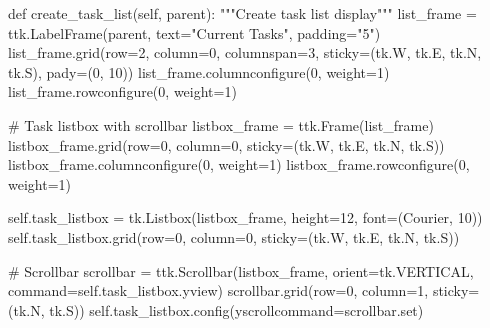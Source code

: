 \documentclass[
  letterpaper,
  DIV=11,
  numbers=noendperiod,
  oneside]{scrreprt}
\newenvironment{Shaded}{}{}
\newcommand{\BuiltInTok}[1]{\textcolor[rgb]{0.84,0.23,0.29}{#1}}
\newcommand{\CommentTok}[1]{\textcolor[rgb]{0.42,0.45,0.49}{#1}}
\newcommand{\DecValTok}[1]{\textcolor[rgb]{0.00,0.36,0.77}{#1}}
\newcommand{\KeywordTok}[1]{\textcolor[rgb]{0.84,0.23,0.29}{#1}}
\newcommand{\NormalTok}[1]{\textcolor[rgb]{0.14,0.16,0.18}{#1}}
\newcommand{\OperatorTok}[1]{\textcolor[rgb]{0.14,0.16,0.18}{#1}}
\newcommand{\StringTok}[1]{\textcolor[rgb]{0.01,0.18,0.38}{#1}}
\newcommand{\VariableTok}[1]{\textcolor[rgb]{0.89,0.38,0.04}{#1}}
\begin{document}
\begin{Shaded}
\begin{Highlighting}[]
    \KeywordTok{def}\NormalTok{ create\_task\_list(}\VariableTok{self}\NormalTok{, parent):}
        \CommentTok{"""Create task list display"""}
\NormalTok{        list\_frame }\OperatorTok{=}\NormalTok{ ttk.LabelFrame(parent, text}\OperatorTok{=}\StringTok{"Current Tasks"}\NormalTok{, padding}\OperatorTok{=}\StringTok{"5"}\NormalTok{)}
\NormalTok{        list\_frame.grid(row}\OperatorTok{=}\DecValTok{2}\NormalTok{, column}\OperatorTok{=}\DecValTok{0}\NormalTok{, columnspan}\OperatorTok{=}\DecValTok{3}\NormalTok{, sticky}\OperatorTok{=}\NormalTok{(tk.W, tk.E, tk.N, tk.S), pady}\OperatorTok{=}\NormalTok{(}\DecValTok{0}\NormalTok{, }\DecValTok{10}\NormalTok{))}
\NormalTok{        list\_frame.columnconfigure(}\DecValTok{0}\NormalTok{, weight}\OperatorTok{=}\DecValTok{1}\NormalTok{)}
\NormalTok{        list\_frame.rowconfigure(}\DecValTok{0}\NormalTok{, weight}\OperatorTok{=}\DecValTok{1}\NormalTok{)}
        
        \CommentTok{\# Task listbox with scrollbar}
\NormalTok{        listbox\_frame }\OperatorTok{=}\NormalTok{ ttk.Frame(list\_frame)}
\NormalTok{        listbox\_frame.grid(row}\OperatorTok{=}\DecValTok{0}\NormalTok{, column}\OperatorTok{=}\DecValTok{0}\NormalTok{, sticky}\OperatorTok{=}\NormalTok{(tk.W, tk.E, tk.N, tk.S))}
\NormalTok{        listbox\_frame.columnconfigure(}\DecValTok{0}\NormalTok{, weight}\OperatorTok{=}\DecValTok{1}\NormalTok{)}
\NormalTok{        listbox\_frame.rowconfigure(}\DecValTok{0}\NormalTok{, weight}\OperatorTok{=}\DecValTok{1}\NormalTok{)}
        
        \VariableTok{self}\NormalTok{.task\_listbox }\OperatorTok{=}\NormalTok{ tk.Listbox(listbox\_frame, height}\OperatorTok{=}\DecValTok{12}\NormalTok{, }
\NormalTok{                                      font}\OperatorTok{=}\NormalTok{(}\StringTok{\textquotesingle{}Courier\textquotesingle{}}\NormalTok{, }\DecValTok{10}\NormalTok{))}
        \VariableTok{self}\NormalTok{.task\_listbox.grid(row}\OperatorTok{=}\DecValTok{0}\NormalTok{, column}\OperatorTok{=}\DecValTok{0}\NormalTok{, sticky}\OperatorTok{=}\NormalTok{(tk.W, tk.E, tk.N, tk.S))}
        
        \CommentTok{\# Scrollbar}
\NormalTok{        scrollbar }\OperatorTok{=}\NormalTok{ ttk.Scrollbar(listbox\_frame, orient}\OperatorTok{=}\NormalTok{tk.VERTICAL, }
\NormalTok{                                 command}\OperatorTok{=}\VariableTok{self}\NormalTok{.task\_listbox.yview)}
\NormalTok{        scrollbar.grid(row}\OperatorTok{=}\DecValTok{0}\NormalTok{, column}\OperatorTok{=}\DecValTok{1}\NormalTok{, sticky}\OperatorTok{=}\NormalTok{(tk.N, tk.S))}
        \VariableTok{self}\NormalTok{.task\_listbox.config(yscrollcommand}\OperatorTok{=}\NormalTok{scrollbar.}\BuiltInTok{set}\NormalTok{)}
        

\end{Highlighting}
\end{Shaded}
\end{document}
